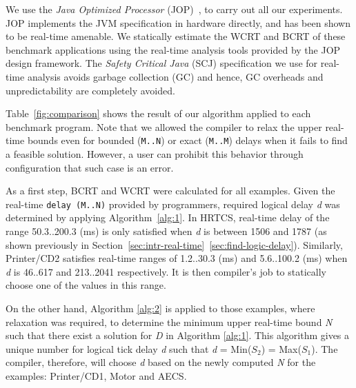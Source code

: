 We use the \textit{Java Optimized Processor}
(JOP)~\cite{jop:jnl:jsa2007}, to carry out all our experiments. JOP
implements the JVM specification in hardware directly, and has been
shown to be real-time amenable. We statically estimate the WCRT and BCRT
of these benchmark applications using the real-time analysis tools
provided by the JOP design framework. The \textit{Safety Critical Java}
(SCJ) specification we use for real-time analysis avoids garbage
collection (GC) and hence, GC overheads and unpredictability are
completely avoided. 


Table~\ref{fig:comparison} shows the result of our algorithm applied to
each benchmark program. Note that we allowed the compiler to relax the
upper real-time bounds even for bounded (\texttt{M..N}) or exact
(\texttt{M..M}) delays when it fails to find a feasible solution.
However, a user can prohibit this behavior through configuration that
such case is an error.

As a first step, BCRT and WCRT were calculated for all examples. Given
the real-time \mbox{\texttt{delay (M..N)}} provided by programmers,
required logical delay \textit{d} was determined by applying
Algorithm~\ref{alg:1}. In HRTCS, real-time delay of the range
50.3..200.3 (ms) is only satisfied when \emph{d} is between 1506 and
1787 (as shown previously in
Section~\ref{sec:intr-real-time}~\ref{sec:find-logic-delay}). Similarly,
Printer/CD2 satisfies real-time ranges of 1.2..30.3 (ms) and 5.6..100.2
(ms) when \emph{d} is 46..617 and 213..2041 respectively. It is then
compiler's job to statically choose one of the values in this range.

On the other hand, Algorithm \ref{alg:2} is applied to those examples,
where relaxation was required, to determine the minimum upper real-time
bound \emph{N} such that there exist a solution for \emph{D} in
Algorithm \ref{alg:1}. This algorithm gives a unique number for logical
tick delay \emph{d} such that \emph{d} = Min(\emph{$S_2$}) =
Max(\emph{$S_1$}).  The compiler, therefore, will choose \emph{d} based
on the newly computed \emph{N} for the examples: Printer/CD1, Motor and
AECS.



